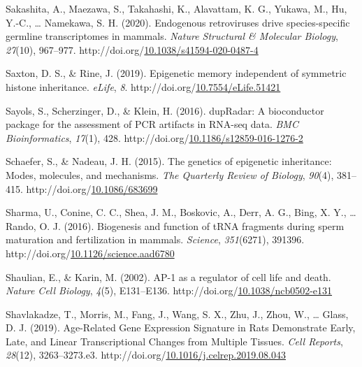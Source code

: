 \documentclass[12pt,twoside]{reedthesis}
\newlength{\cslhangindent}
\newenvironment{CSLReferences}[2] %
 {%
  \setlength{\parindent}{0pt}
  \ifodd #1 \everypar{\setlength{\hangindent}{\cslhangindent}}\ignorespaces\fi
  \ifnum #2 > 0
  \setlength{\parskip}{#2\baselineskip}
  \fi
 }%
 {}
\begin{document}
\begin{CSLReferences}{1}{0}
\leavevmode{}%
Sakashita, A., Maezawa, S., Takahashi, K., Alavattam, K. G., Yukawa, M., Hu, Y.-C., \ldots{} Namekawa, S. H. (2020). Endogenous retroviruses drive species-specific germline transcriptomes in mammals. \emph{Nature Structural \& Molecular Biology}, \emph{27}(10), 967--977. http://doi.org/\href{https://doi.org/10.1038/s41594-020-0487-4}{10.1038/s41594-020-0487-4}

\leavevmode{}%
Saxton, D. S., \& Rine, J. (2019). Epigenetic memory independent of symmetric histone inheritance. \emph{eLife}, \emph{8}. http://doi.org/\href{https://doi.org/10.7554/eLife.51421}{10.7554/eLife.51421}

\leavevmode{}%
Sayols, S., Scherzinger, D., \& Klein, H. (2016). dupRadar: A bioconductor package for the assessment of PCR artifacts in RNA-seq data. \emph{BMC Bioinformatics}, \emph{17}(1), 428. http://doi.org/\href{https://doi.org/10.1186/s12859-016-1276-2}{10.1186/s12859-016-1276-2}

\leavevmode{}%
Schaefer, S., \& Nadeau, J. H. (2015). The genetics of epigenetic inheritance: Modes, molecules, and mechanisms. \emph{The Quarterly Review of Biology}, \emph{90}(4), 381--415. http://doi.org/\href{https://doi.org/10.1086/683699}{10.1086/683699}

\leavevmode{}%
Sharma, U., Conine, C. C., Shea, J. M., Boskovic, A., Derr, A. G., Bing, X. Y., \ldots{} Rando, O. J. (2016). Biogenesis and function of tRNA fragments during sperm maturation and fertilization in mammals. \emph{Science}, \emph{351}(6271), 391396. http://doi.org/\href{https://doi.org/10.1126/science.aad6780}{10.1126/science.aad6780}

\leavevmode{}%
Shaulian, E., \& Karin, M. (2002). AP-1 as a regulator of cell life and death. \emph{Nature Cell Biology}, \emph{4}(5), E131--E136. http://doi.org/\href{https://doi.org/10.1038/ncb0502-e131}{10.1038/ncb0502-e131}

\leavevmode{}%
Shavlakadze, T., Morris, M., Fang, J., Wang, S. X., Zhu, J., Zhou, W., \ldots{} Glass, D. J. (2019). Age-Related Gene Expression Signature in Rats Demonstrate Early, Late, and Linear Transcriptional Changes from Multiple Tissues. \emph{Cell Reports}, \emph{28}(12), 3263--3273.e3. http://doi.org/\href{https://doi.org/10.1016/j.celrep.2019.08.043}{10.1016/j.celrep.2019.08.043}


\end{CSLReferences}
\end{document}
